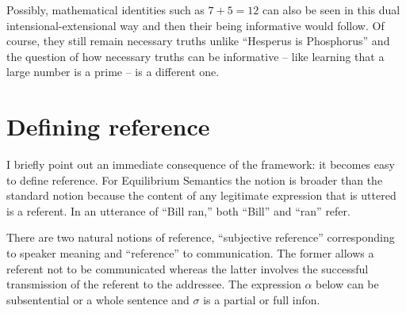 Possibly, mathematical identities such as $7 + 5 = 12$ can also be seen in this dual intensional-extensional way and then their being informative would follow. Of course, they still remain necessary truths unlike ``Hesperus is Phosphorus'' and the question of how necessary
truths can be informative -- like learning that a large number is a prime -- is a different one.  



\section{Defining reference}
I briefly point out an immediate consequence of the framework: it becomes easy to define reference. For Equilibrium Semantics the notion is broader than the standard notion because the content of any legitimate expression that is uttered is a referent. In an utterance of ``Bill ran,'' both ``Bill'' and ``ran'' refer.

There are two natural notions of reference, ``subjective reference'' corresponding to speaker meaning and ``reference'' to communication. The former allows a referent not to be communicated whereas the latter involves the successful transmission of the referent to the addressee. The expression $\alpha$ below can be subsentential or a whole sentence and $\sigma$ is a partial or full infon.

%
%
%
%
%

